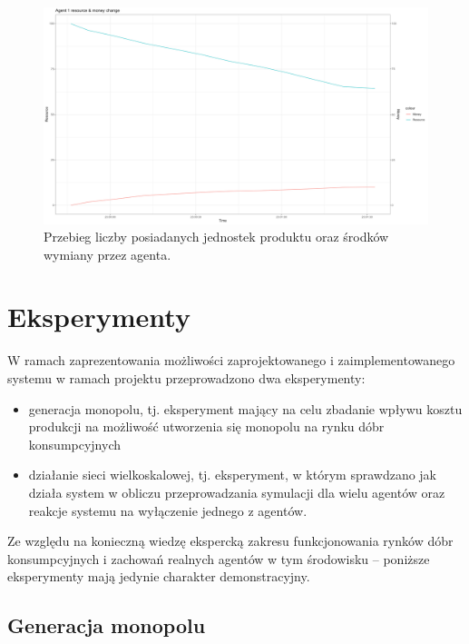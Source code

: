 \documentclass{article}
\begin{document}
\begin{figure}[H]
	\centering
	\includegraphics[width=\textwidth]{./analytics-image.png}
	\caption{Przebieg liczby posiadanych jednostek produktu oraz środków wymiany przez agenta.}
	\label{analytics-image}
\end{figure}

\section{Eksperymenty \label{sec3}}

W ramach zaprezentowania możliwości zaprojektowanego i zaimplementowanego systemu w ramach projektu przeprowadzono dwa eksperymenty:

\begin{itemize}
	\item generacja monopolu, tj. eksperyment mający na celu zbadanie wpływu kosztu produkcji na możliwość utworzenia się monopolu na rynku dóbr konsumpcyjnych	
	\item działanie sieci wielkoskalowej, tj. eksperyment, w którym sprawdzano jak działa system w obliczu przeprowadzania symulacji dla wielu agentów oraz reakcje systemu na wyłączenie jednego z agentów.
\end{itemize}


Ze względu na konieczną wiedzę ekspercką zakresu funkcjonowania rynków dóbr konsumpcyjnych i zachowań realnych agentów w tym środowisku -- 
poniższe eksperymenty mają jedynie charakter demonstracyjny.  

\subsection{Generacja monopolu}
\end{document}
